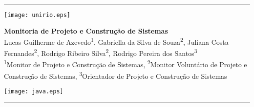 \documentclass[a0, portrait, final]{a0poster}
\begin{document}
\noindent \rule{\textwidth}{6pt}

\vspace{1.0cm}

\begin{minipage}[t]{0.98\linewidth}
  \begin{minipage}[t]{0.16\linewidth}
  \begin{center}
		\texttt{[image: unirio.eps]}
  \end{center}
  \end{minipage}
  \begin{minipage}[b]{0.67\linewidth}
    \begin{center}
      {\Huge \bfseries Monitoria de Projeto e Construção de Sistemas}\\[12mm]
      {\Large Lucas Guilherme de Azevedo\textsuperscript{1}, Gabriella da Silva de Souza\textsuperscript{2}, Juliana Costa Fernandes\textsuperscript{2}, Rodrigo Ribeiro Silva\textsuperscript{2}, Rodrigo Pereira dos Santos\textsuperscript{3}} \\[6mm]
			{\large \textsuperscript{1}Monitor de Projeto e Construção de Sistemas, \textsuperscript{2}Monitor Voluntário de Projeto e Construção de Sistemas, \textsuperscript{3}Orientador de Projeto e Construção de Sistemas} \\
		\end{center}
  \end{minipage}
  \begin{minipage}[t]{0.16\linewidth}
    \begin{center} 
		\texttt{[image: java.eps]}
    \end{center}
  \end{minipage}
\end{minipage}

\vspace{1.0cm}

\noindent \rule{\textwidth}{4pt}

\vspace{1.5cm}
\end{document}
